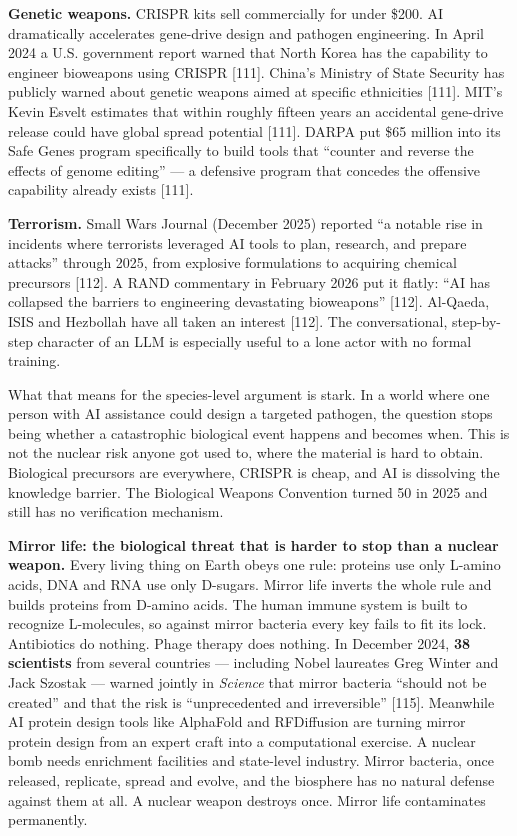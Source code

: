 \documentclass[11pt,a4paper]{article}
\begin{document}
\textbf{Genetic weapons.} CRISPR kits sell commercially for under \$200. AI dramatically accelerates gene-drive design and pathogen engineering. In April 2024 a U.S. government report warned that North Korea has the capability to engineer bioweapons using CRISPR [111]. China's Ministry of State Security has publicly warned about genetic weapons aimed at specific ethnicities [111]. MIT's Kevin Esvelt estimates that within roughly fifteen years an accidental gene-drive release could have global spread potential [111]. DARPA put \$65 million into its Safe Genes program specifically to build tools that ``counter and reverse the effects of genome editing'' --- a defensive program that concedes the offensive capability already exists [111].

\textbf{Terrorism.} Small Wars Journal (December 2025) reported ``a notable rise in incidents where terrorists leveraged AI tools to plan, research, and prepare attacks'' through 2025, from explosive formulations to acquiring chemical precursors [112]. A RAND commentary in February 2026 put it flatly: ``AI has collapsed the barriers to engineering devastating bioweapons'' [112]. Al-Qaeda, ISIS and Hezbollah have all taken an interest [112]. The conversational, step-by-step character of an LLM is especially useful to a lone actor with no formal training.

What that means for the species-level argument is stark. In a world where one person with AI assistance could design a targeted pathogen, the question stops being whether a catastrophic biological event happens and becomes when. This is not the nuclear risk anyone got used to, where the material is hard to obtain. Biological precursors are everywhere, CRISPR is cheap, and AI is dissolving the knowledge barrier. The Biological Weapons Convention turned 50 in 2025 and still has no verification mechanism.

\textbf{Mirror life: the biological threat that is harder to stop than a nuclear weapon.} Every living thing on Earth obeys one rule: proteins use only L-amino acids, DNA and RNA use only D-sugars. Mirror life inverts the whole rule and builds proteins from D-amino acids. The human immune system is built to recognize L-molecules, so against mirror bacteria every key fails to fit its lock. Antibiotics do nothing. Phage therapy does nothing. In December 2024, \textbf{38 scientists} from several countries --- including Nobel laureates Greg Winter and Jack Szostak --- warned jointly in \textit{Science} that mirror bacteria ``should not be created'' and that the risk is ``unprecedented and irreversible'' [115]. Meanwhile AI protein design tools like AlphaFold and RFDiffusion are turning mirror protein design from an expert craft into a computational exercise. A nuclear bomb needs enrichment facilities and state-level industry. Mirror bacteria, once released, replicate, spread and evolve, and the biosphere has no natural defense against them at all. A nuclear weapon destroys once. Mirror life contaminates permanently.
\end{document}
